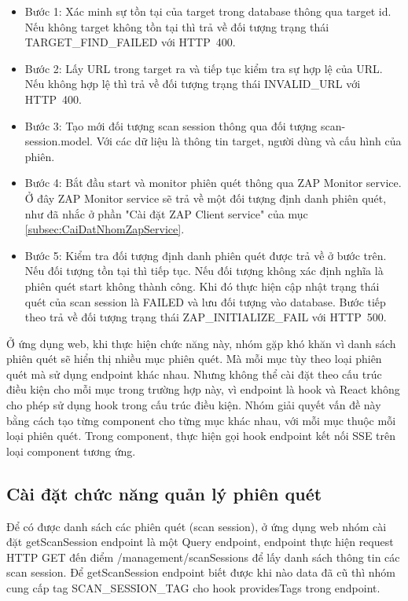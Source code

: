 \begin{itemize}
  \item Bước 1: Xác minh sự tồn tại của target trong database thông qua target id. Nếu không target không tồn tại thì trả về đối tượng trạng thái TARGET\_FIND\_FAILED với HTTP\ 400.
  \item Bước 2: Lấy URL trong target ra và tiếp tục kiểm tra sự hợp lệ của URL. Nếu không hợp lệ thì trả về đối tượng trạng thái INVALID\_URL với HTTP\ 400.
  \item Bước 3: Tạo mới đối tượng scan session thông qua đối tượng scan-session.model. Với các dữ liệu là thông tin target, người dùng và cấu hình của phiên.
  \item Bước 4: Bắt đầu start và monitor phiên quét thông qua ZAP Monitor service. Ở đây ZAP Monitor service sẽ trả về một đối tượng định danh phiên quét, như đã nhắc ở phần "Cài đặt ZAP Client service" của mục \ref{subsec:CaiDatNhomZapService}.
  \item Bước 5: Kiểm tra đối tượng định danh phiên quét được trả về ở bước trên. Nếu đối tượng tồn tại thì tiếp tục. Nếu đối tượng không xác định nghĩa là phiên quét start không thành công. Khi đó thực hiện cập nhật trạng thái quét của scan session là FAILED và lưu đối tượng vào database. Bước tiếp theo trả về đối tượng trạng thái ZAP\_INITIALIZE\_FAIL với HTTP\ 500.
\end{itemize}

Ở ứng dụng web, khi thực hiện chức năng này, nhóm gặp khó khăn vì danh sách phiên quét sẽ hiển thị nhiều mục phiên quét.
Mà mỗi mục tùy theo loại phiên quét mà sử dụng endpoint khác nhau.
Nhưng không thể cài đặt theo cấu trúc điều kiện cho mỗi mục trong trường hợp này, vì endpoint là hook và React không cho phép sử dụng hook trong cấu trúc điều kiện.
Nhóm giải quyết vấn đề này bằng cách tạo từng component cho từng mục khác nhau, với mỗi mục thuộc mỗi loại phiên quét.
Trong component, thực hiện gọi hook endpoint kết nối SSE trên loại component tương ứng. 

\subsection{Cài đặt chức năng quản lý phiên quét} \label{subsec:CaiDatQuanLyPhienQuet}

\tab Để có được danh sách các phiên quét (scan session), ở ứng dụng web nhóm cài đặt getScanSession endpoint là một Query endpoint, endpoint thực hiện request HTTP GET đến điểm /management/scanSessions để lấy danh sách thông tin các scan session. Để getScanSession endpoint biết được khi nào data đã cũ thì nhóm cung cấp tag SCAN\_SESSION\_TAG cho hook providesTags trong endpoint.


